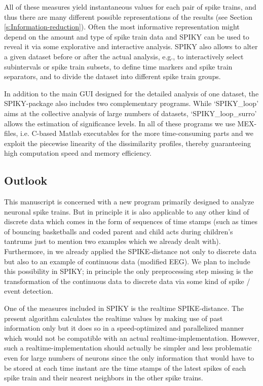 \documentclass[10pt,twocolumn]{elsart5p}
\begin{document}
All of these measures yield instantaneous values for each pair of spike trains, and thus there are many different possible representations of the results (see Section \ref{s:Information-reduction}). Often the most informative representation might depend on the amount and type of spike train data and SPIKY can be used to reveal it via some explorative and interactive analysis. SPIKY also allows to alter a given dataset before or after the actual analysis, e.g., to interactively select subintervals or spike train subsets, to define time markers and spike train separators, and to divide the dataset into different spike train groups. 

In addition to the main GUI designed for the detailed analysis of one dataset, the SPIKY-package also includes two complementary programs. While `SPIKY\_loop' aims at the collective analysis of large numbers of datasets, `SPIKY\_loop\_surro' allows the estimation of significance levels. In all of these programs we use MEX-files, i.e. C-based Matlab executables for the more time-consuming parts and we exploit the piecewise linearity of the dissimilarity profiles, thereby guaranteeing high computation speed and memory efficiency.


\subsection{\label{ss:Outlook} Outlook}

This manuscript is concerned with a new program primarily designed to analyze neuronal spike trains. But in principle it is also applicable to any other kind of discrete data which comes in the form of sequences of time stamps (such as times of bouncing basketballs and coded parent and child acts during children's tantrums just to mention two examples which we already dealt with). Furthermore, in \citet{Kreuz13} we already applied the SPIKE-distance not only to discrete data but also to an example of continuous data (modified EEG). We plan to include this possibility in SPIKY; in principle the only preprocessing step missing is the transformation of the continuous data to discrete data via some kind of spike / event detection.

One of the measures included in SPIKY is the realtime SPIKE-distance. The present algorithm calculates the realtime values by making use of past information only but it does so in a speed-optimized and parallelized manner which would not be compatible with an actual realtime-implementation. However, such a realtime-implementation should actually be simpler and less problematic even for large numbers of neurons since the only information that would have to be stored at each time instant are the time stamps of the latest spikes of each spike train and their nearest neighbors in the other spike trains.
\end{document}
